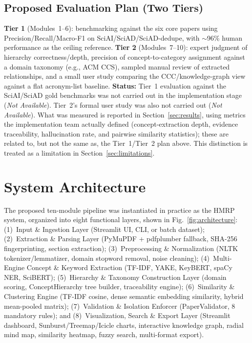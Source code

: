 \documentclass[10pt,conference]{IEEEtran}
\begin{document}
\subsection{Proposed Evaluation Plan (Two Tiers)}
\textbf{Tier 1} (Modules~1--6): benchmarking against the six core papers using Precision/Recall/Macro-F1 on SciAI/SciAD/SciAD-dedupe, with $\sim$96\% human performance as the ceiling reference. \textbf{Tier 2} (Modules~7--10): expert judgment of hierarchy correctness/depth, precision of concept-to-category assignment against a domain taxonomy (e.g., ACM CCS), sampled manual review of extracted relationships, and a small user study comparing the CCC/knowledge-graph view against a flat acronym-list baseline. \textbf{Status:} Tier~1 evaluation against the SciAI/SciAD gold benchmarks was not carried out in the implementation stage (\emph{Not Available}). Tier~2's formal user study was also not carried out (\emph{Not Available}). What was measured is reported in Section~\ref{sec:results}, using metrics the implementation team actually defined (concept-extraction depth, evidence traceability, hallucination rate, and pairwise similarity statistics); these are related to, but not the same as, the Tier~1/Tier~2 plan above. This distinction is treated as a limitation in Section~\ref{sec:limitations}.

\section{System Architecture}
\label{sec:architecture}
The proposed ten-module pipeline was instantiated in practice as the HMRP system, organized into eight functional layers, shown in Fig.~\ref{fig:architecture}: (1)~Input \& Ingestion Layer (Streamlit UI, CLI, or batch dataset); (2)~Extraction \& Parsing Layer (PyMuPDF + pdfplumber fallback, SHA-256 fingerprinting, section extraction); (3)~Preprocessing \& Normalization (NLTK tokenizer/lemmatizer, domain stopword removal, noise cleaning); (4)~Multi-Engine Concept \& Keyword Extraction (TF-IDF, YAKE, KeyBERT, spaCy NER, SciBERT); (5)~Hierarchy \& Taxonomy Construction Layer (domain scoring, ConceptHierarchy tree builder, traceability engine); (6)~Similarity \& Clustering Engine (TF-IDF cosine, dense semantic embedding similarity, hybrid mean-pooled matrix); (7)~Validation \& Isolation Enforcer (PaperValidator, 8 mandatory rules); and (8)~Visualization, Search \& Export Layer (Streamlit dashboard, Sunburst/Treemap/Icicle charts, interactive knowledge graph, radial mind map, similarity heatmap, fuzzy search, multi-format export).
\end{document}
